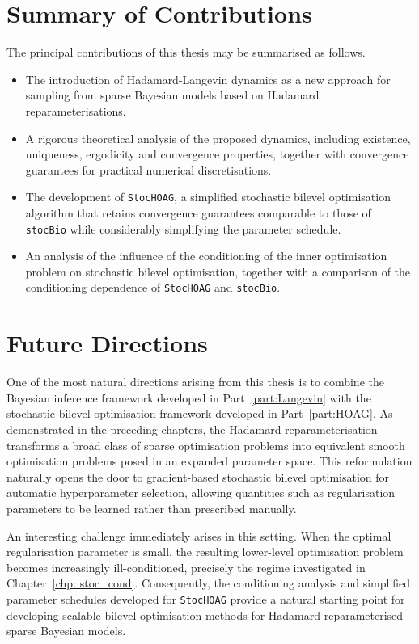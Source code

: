 \documentclass[11pt, twoside]{report}
\begin{document}
\section{Summary of Contributions}

The principal contributions of this thesis may be summarised as follows.

\begin{itemize}
    \item The introduction of Hadamard-Langevin dynamics as a new approach for sampling from sparse Bayesian models based on Hadamard reparameterisations.

    \item A rigorous theoretical analysis of the proposed dynamics, including existence, uniqueness, ergodicity and convergence properties, together with convergence guarantees for practical numerical discretisations.

    \item The development of \texttt{StocHOAG}, a simplified stochastic bilevel optimisation algorithm that retains convergence guarantees comparable to those of \texttt{stocBio} while considerably simplifying the parameter schedule.

    \item An analysis of the influence of the conditioning of the inner optimisation problem on stochastic bilevel optimisation, together with a comparison of the conditioning dependence of \texttt{StocHOAG} and \texttt{stocBio}.
\end{itemize}

\section{Future Directions}

One of the most natural directions arising from this thesis is to combine the Bayesian inference framework developed in Part~\ref{part:Langevin} with the stochastic bilevel optimisation framework developed in Part~\ref{part:HOAG}. As demonstrated in the preceding chapters, the Hadamard reparameterisation transforms a broad class of sparse optimisation problems into equivalent smooth optimisation problems posed in an expanded parameter space. This reformulation naturally opens the door to gradient-based stochastic bilevel optimisation for automatic hyperparameter selection, allowing quantities such as regularisation parameters to be learned rather than prescribed manually.

An interesting challenge immediately arises in this setting. When the optimal regularisation parameter is small, the resulting lower-level optimisation problem becomes increasingly ill-conditioned, precisely the regime investigated in Chapter~\ref{chp: stoc_cond}. Consequently, the conditioning analysis and simplified parameter schedules developed for \texttt{StocHOAG} provide a natural starting point for developing scalable bilevel optimisation methods for Hadamard-reparameterised sparse Bayesian models.
\end{document}

